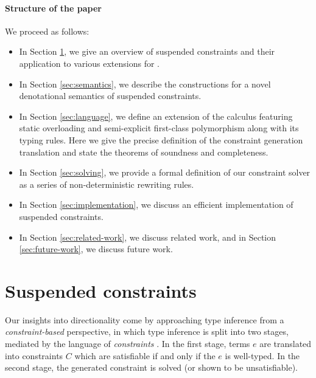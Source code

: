 \documentclass[acmsmall,screen,nonacm]{acmart}
\begin{document}
\paragraph{Structure of the paper} We proceed as follows:
\begin{itemize}
\item In Section \ref{sec:constraints}, we give an overview of suspended constraints and their 
application to various extensions for \ML. 
\item In Section \ref{sec:semantics}, we describe the constructions for a
  novel denotational semantics of suspended constraints.
\item In Section \ref{sec:language}, we define an extension of the \ML calculus featuring
  static overloading and semi-explicit first-class polymorphism along with its typing rules.
  Here we give the precise definition of the constraint generation translation and state the theorems 
  of soundness and completeness. 
\item In Section \ref{sec:solving}, we provide a formal definition of our constraint solver 
  as a series of non-deterministic rewriting rules. 
\item In Section \ref{sec:implementation}, we discuss an efficient implementation of suspended constraints.
\item In Section \ref{sec:related-work}, we discuss related work, and in
  Section \ref{sec:future-work}, we discuss future work.
\end{itemize}

\section{Suspended constraints}
\label{sec:constraints}



Our insights into directionality come by approaching type inference from a \textit{constraint-based} \citep{TODO} 
perspective, in which type inference is split into two stages, mediated by the language of \textit{constraints} \citep{TODO}. 
In the first stage, terms $e$ are translated into constraints $C$ which are satisfiable if and only if 
the $e$ is well-typed. In the second stage, the generated constraint is solved (or shown to be unsatisfiable). 
\end{document}

